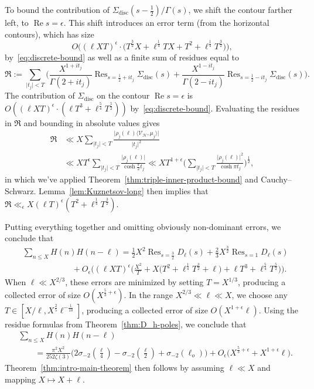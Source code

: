 \documentclass[11pt,reqno]{amsart}
\theoremstyle{plain}
\theoremstyle{definition}
\numberwithin{equation}{section}
\renewcommand{\Re}{\operatorname{Re}}
\DeclareMathOperator*{\Res}{Res}
\begin{document}
To bound the contribution of $\Sigma_{\mathrm{disc}}(s-\frac{1}{2})/\Gamma(s)$, we shift the contour farther left, to $\Re s = \epsilon$. This shift introduces an error term (from the horizontal contours), which has size
\[
	O\Big(
	(\ell X T)^\epsilon \cdot
	\big( T^{\frac{3}{2}}X + \ell^{\frac{1}{4}} T X 
			+ T^2 + \ell^{\frac{1}{4}} T^{\frac{3}{2}} \big)
	\Big),
\]
by~\eqref{eq:discrete-bound} as well as a finite sum of residues equal to
\[
	\mathfrak{R} :=
		\sum_{\vert t_j \vert < T}
		\Big( \frac{X^{1+it_j}}{\Gamma(2+it_j)} \Res_{s=\frac{1}{2}+it_j} \Sigma_{\mathrm{disc}}(s) 
		+  \frac{X^{1-it_j}}{\Gamma(2-it_j)} \Res_{s=\frac{1}{2}-it_j} \Sigma_{\mathrm{disc}}(s) \Big).
\]
The contribution of $\Sigma_{\mathrm{disc}}$ on the contour $\Re s = \epsilon$ is $O( (\ell X T)^\epsilon \cdot ( \ell T^3 + \ell^{\frac{5}{4}} T^{\frac{5}{2}} ))$ by~\eqref{eq:discrete-bound}. Evaluating the residues in $\mathfrak{R}$ and bounding in absolute values gives
\begin{align*}
	\mathfrak{R} & 
	\ll X
	\sum_{\vert t_j \vert < T}
		\frac{\vert \rho_j(\ell) \langle \mathcal{V}_\mathcal{H}, \mu_j \rangle \vert}{\vert t_j \vert^2} \\
&	\ll X T^\epsilon \sum_{\vert t_j \vert < T} 
			\frac{\vert \rho_j(\ell)\vert}{\cosh \frac{\pi}{2} t_j}
	\ll X T^{1+\epsilon} \Big( \sum_{\vert t_j \vert < T}  
	\frac{\vert \rho_j(\ell) \vert^2}{\cosh \pi t_j}  \Big)^{\frac{1}{2}},
\end{align*}
in which we've applied Theorem~\ref{thm:triple-inner-product-bound} and Cauchy--Schwarz. Lemma~\ref{lem:Kuznetsov-long} then implies that $\mathfrak{R} \ll_\epsilon X (\ell T)^\epsilon (T^2+ \ell^{\frac{1}{4}} T^{\frac{3}{2}})$.

Putting everything together and omitting obviously non-dominant errors, we conclude that
\begin{align*}
	& \sum_{n \leq X} H(n) H(n-\ell)  =
		\tfrac{1}{2} X^2 \Res_{s=\frac{3}{2}} D_\ell(s)
		+ \tfrac{2}{3} X^\frac{3}{2} \Res_{s=1} D_\ell(s) \\
	 & \qquad\qquad\qquad
		+ O_{\epsilon}\Big( \! (\ell X T)^\epsilon 
		\Big(\frac{X^2}{T} 
						+ X\big(T^2 + \ell^{\frac{1}{4}} T^{\frac{3}{2}} 
						+ \ell \big) 
						+ \ell T^3 + \ell^{\frac{5}{4}} T^{\frac{5}{2}}\Big) \!\Big).
\end{align*}
When $\ell \ll X^{2/3}$, these errors are minimized by setting $T = X^{1/3}$, producing a collected error of size $O(X^{\frac{5}{3}+\epsilon})$. In the range $X^{2/3} \ll \ell \ll X$, we choose any $T \in [X/\ell, X^{\frac{2}{5}} \ell^{-\frac{1}{10}}]$, producing a collected error of size $O(X^{1+\epsilon} \ell)$.
Using the residue formulas from Theorem~\ref{thm:D_h-poles}, we conclude that
\begin{align*}
	& \sum_{n \leq X} H(n) H(n-\ell) \\[-.5em]
	& \qquad 
		= \frac{\pi^2 X^2}{252\zeta(3)}
				\big(2\sigma_{-2}(\tfrac{\ell}{4}) - \sigma_{-2}(\tfrac{\ell}{2})+\sigma_{-2}(\ell_o) \big) 
	+ O_\epsilon\big(X^{\frac{5}{3}+\epsilon} 
			+ X^{1+\epsilon} \ell \big).
\end{align*}
Theorem~\ref{thm:intro-main-theorem} then follows by assuming $\ell \ll X$ and mapping $X \mapsto X+ \ell$.
\end{document}
